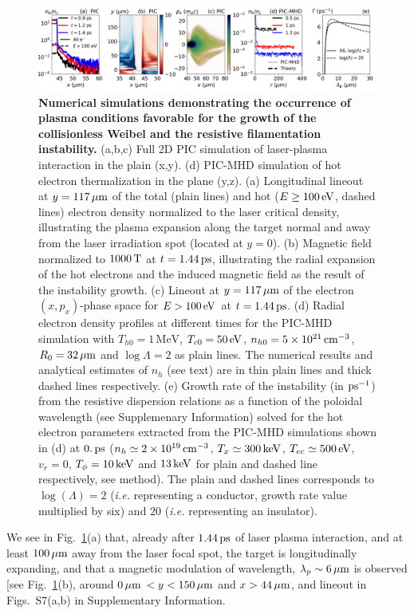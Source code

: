 \documentclass[aps,twocolumn,showpacs,superscriptaddress]{revtex4}
\begin{document}
\begin{figure}[tbh!]
\includegraphics[scale=0.4]{figure_3.png}
\caption{\label{fig:pic} 
\textbf{Numerical simulations demonstrating the occurrence of plasma conditions favorable for the growth of the collisionless Weibel and the resistive filamentation instability. }
(a,b,c) Full 2D PIC simulation of  laser-plasma interaction in the plain (x,y).
(d) PIC-MHD simulation of hot electron thermalization in the plane (y,z).
(a)  Longitudinal lineout at $y=117\,\rm \mu m$ of the total (plain lines) and hot ($E\ge 100\,\rm eV$, dashed lines) electron density normalized to the laser critical density, illustrating the plasma expansion along the target normal and away from the laser irradiation spot (located at $y=0$).  
(b) Magnetic field   normalized to $1000\,\rm T$ at $t =1.44\,\rm ps$, illustrating the radial expansion of the hot electrons and the induced magnetic field as the result of the instability growth.
(c) Lineout at $y = 117\,\rm \mu m$ of the electron $(x,p_x)$-phase space for $E>100\,\rm eV$  at $t =1.44\,\rm ps$. 
(d) Radial electron density profiles at different times  for the PIC-MHD simulation with $T_{h0} = 1\,\mathrm{MeV}$, $T_{c0} = 50\,\rm eV$, $n_{h0} = 5 \times 10^{21}\,\rm cm^{-3}$, $R_0 = 32\,\rm \mu m$ and $\log \Lambda =2$ as plain lines. The numerical results and analytical  estimates of $n_h$ (see text) are in thin plain lines and thick dashed lines respectively.
(e) Growth  rate of the instability (in $\rm ps^{-1}$) from the  resistive dispersion relations as a function of the poloidal wavelength (see Supplemenary Information) solved for the hot electron parameters extracted from the PIC-MHD simulations shown in (d) at $0.\,\rm ps$ ($n_h \simeq 2\times 10^{19}\,\rm cm^{-3}$,  $T_{x} \simeq 300\,\rm keV$, $T_{ec} \simeq 500\,\rm eV$, $v_r=0$,  $T_\phi = 10\,\rm keV$ and $13\,\rm keV$ for plain  and dashed line respectively, see method). 
The plain and dashed lines corresponds to $\log(\Lambda)=2$ (\emph{i.e.} representing a conductor, growth rate value multiplied by six) and $20$ (\emph{i.e.} representing an insulator). 
}
\end{figure}
We see in Fig.~\ref{fig:pic}(a) that, already after $1.44\,\rm ps$ of laser plasma interaction, and at least $100\,\rm \mu m$ away from the laser focal spot, the target is longitudinally  expanding, and that  a magnetic modulation  of wavelength, $\lambda_p \sim 6\,\rm\mu m$ is observed [see Fig.~\ref{fig:pic}(b), around $0\,\rm \mu m$ $<y<150\,\rm \mu m$ and $x>44\,\rm \mu m$, and lineout in Figs.~S7(a,b) in Supplementary Information.
\end{document}
